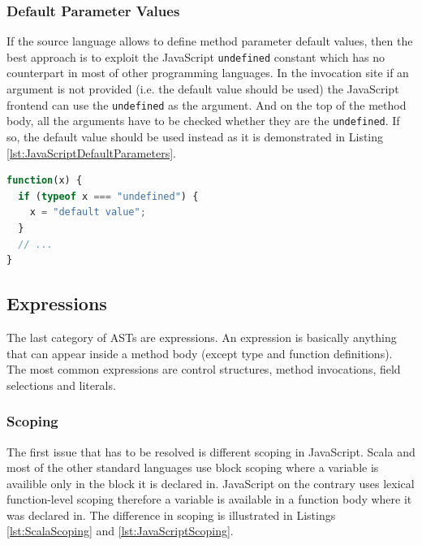\documentclass[12pt,a4paper]{report}
\begin{document}
\subsubsection*{Default Parameter Values}

If the source language allows to define method parameter default values, then the best approach is to exploit the JavaScript \texttt{undefined} constant which has no counterpart in most of other programming languages. In the invocation site if an argument is not provided (i.e. the default value should be used) the JavaScript frontend can use the \texttt{undefined} as the argument. And on the top of the method body, all the arguments have to be checked whether they are the \texttt{undefined}. If so, the default value should be used instead as it is demonstrated in Listing \ref{lst:JavaScriptDefaultParameters}.

\begin{minipage}{\linewidth}
\begin{lstlisting}[language=JavaScript,caption={Default parameters in JavaScript.},label={lst:JavaScriptDefaultParameters}]
function(x) {
  if (typeof x === "undefined") {
    x = "default value";	
  }
  // ...
}
\end{lstlisting}
\end{minipage}

\subsection{Expressions}

The last category of ASTs are expressions. An expression is basically anything that can appear inside a method body (except type and function definitions). The most common expressions are control structures, method invocations, field selections and literals.

\subsubsection*{Scoping}

The first issue that has to be resolved is different scoping in JavaScript. Scala and most of the other standard languages use block scoping where a variable is availible only in the block it is declared in. JavaScript on the contrary uses lexical function-level scoping therefore a variable is available in a function body where it was declared in. The difference in scoping is illustrated in Listings \ref{lst:ScalaScoping} and \ref{lst:JavaScriptScoping}.
\end{document}
